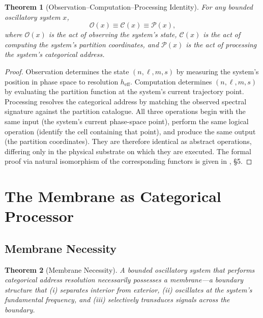 \documentclass[11pt,twocolumn,a4paper]{article}
\newtheorem{theorem}{Theorem}[section]
\theoremstyle{definition}
\theoremstyle{remark}
\newcommand{\Obs}{\mathcal{O}}
\newcommand{\Comp}{\mathcal{C}}
\newcommand{\Proc}{\mathcal{P}}
\begin{document}
\begin{theorem}[Observation--Computation--Processing Identity]\label{thm:OCP}
For any bounded oscillatory system $x$,
\begin{equation}\label{eq:OCP}
    \Obs(x) \equiv \Comp(x) \equiv \Proc(x),
\end{equation}
where $\Obs(x)$ is the act of observing the system's state, $\Comp(x)$ is the act of computing the system's partition coordinates, and $\Proc(x)$ is the act of processing the system's categorical address.
\end{theorem}

\begin{proof}
Observation determines the state $(n, \ell, m, s)$ by measuring the system's position in phase space to resolution $h_{\mathrm{eff}}$.  Computation determines $(n, \ell, m, s)$ by evaluating the partition function at the system's current trajectory point.  Processing resolves the categorical address by matching the observed spectral signature against the partition catalogue.  All three operations begin with the same input (the system's current phase-space point), perform the same logical operation (identify the cell containing that point), and produce the same output (the partition coordinates).  They are therefore identical as abstract operations, differing only in the physical substrate on which they are executed.  The formal proof via natural isomorphism of the corresponding functors is given in \citet{sachikonye2026metacognitive}, \S5.
\end{proof}




\section{The Membrane as Categorical Processor}\label{sec:membrane}

\subsection{Membrane Necessity}

\begin{theorem}[Membrane Necessity]\label{thm:membrane-necessity}
A bounded oscillatory system that performs categorical address resolution necessarily possesses a membrane---a boundary structure that (i) separates interior from exterior, (ii) oscillates at the system's fundamental frequency, and (iii) selectively transduces signals across the boundary.
\end{theorem}
\end{document}
